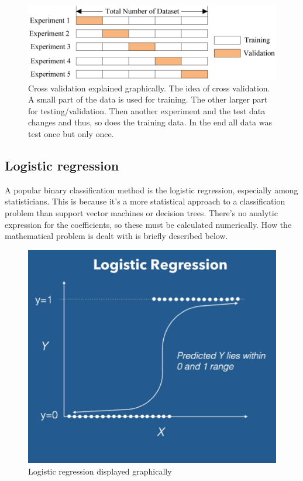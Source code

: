 \begin{figure}[H]
\centering
\includegraphics[scale=0.3]{pictures/Cross_validation}
\caption{Cross validation explained graphically. The idea of cross validation. A small part of the data is used for training. The other larger part for testing/validation. Then another experiment and the test data changes and thus, so does the training data. In the end all data was test once but only once.}
\end{figure}

	\subsection{Logistic regression}
\setlength{\parindent}{0cm}
A popular binary classification method is the logistic regression, especially among statisticians. This is because it's a more statistical approach to a classification problem than support vector machines or decision trees. There’s no analytic expression for the coefficients, so these must be calculated numerically. How the mathematical problem is dealt with is briefly described below. 
\\
\par 

\begin{figure}[H]
\centering
\includegraphics[scale=0.2]{pictures/LogReg}
\caption{Logistic regression displayed graphically}
\end{figure}

